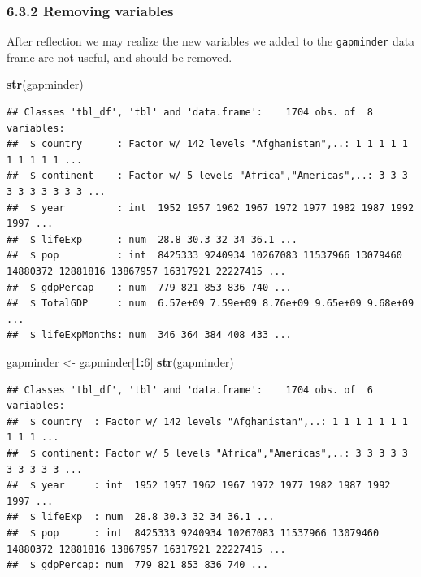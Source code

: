 \documentclass[]{article}
\newenvironment{Shaded}{\begin{snugshade}}{\end{snugshade}}
\newcommand{\KeywordTok}[1]{\textcolor[rgb]{0.13,0.29,0.53}{\textbf{#1}}}
\newcommand{\DecValTok}[1]{\textcolor[rgb]{0.00,0.00,0.81}{#1}}
\newcommand{\StringTok}[1]{\textcolor[rgb]{0.31,0.60,0.02}{#1}}
\newcommand{\OperatorTok}[1]{\textcolor[rgb]{0.81,0.36,0.00}{\textbf{#1}}}
\newcommand{\NormalTok}[1]{#1}
\begin{document}
\subsubsection{6.3.2 Removing variables}\label{removing-variables}

After reflection we may realize the new variables we added to the
\texttt{gapminder} data frame are not useful, and should be removed.

\begin{Shaded}
\begin{Highlighting}[]
\KeywordTok{str}\NormalTok{(gapminder)}
\end{Highlighting}
\end{Shaded}

\begin{verbatim}
## Classes 'tbl_df', 'tbl' and 'data.frame':    1704 obs. of  8 variables:
##  $ country      : Factor w/ 142 levels "Afghanistan",..: 1 1 1 1 1 1 1 1 1 1 ...
##  $ continent    : Factor w/ 5 levels "Africa","Americas",..: 3 3 3 3 3 3 3 3 3 3 ...
##  $ year         : int  1952 1957 1962 1967 1972 1977 1982 1987 1992 1997 ...
##  $ lifeExp      : num  28.8 30.3 32 34 36.1 ...
##  $ pop          : int  8425333 9240934 10267083 11537966 13079460 14880372 12881816 13867957 16317921 22227415 ...
##  $ gdpPercap    : num  779 821 853 836 740 ...
##  $ TotalGDP     : num  6.57e+09 7.59e+09 8.76e+09 9.65e+09 9.68e+09 ...
##  $ lifeExpMonths: num  346 364 384 408 433 ...
\end{verbatim}

\begin{Shaded}
\begin{Highlighting}[]
\NormalTok{gapminder <-}\StringTok{ }\NormalTok{gapminder[}\DecValTok{1}\OperatorTok{:}\DecValTok{6}\NormalTok{]}
\KeywordTok{str}\NormalTok{(gapminder)}
\end{Highlighting}
\end{Shaded}

\begin{verbatim}
## Classes 'tbl_df', 'tbl' and 'data.frame':    1704 obs. of  6 variables:
##  $ country  : Factor w/ 142 levels "Afghanistan",..: 1 1 1 1 1 1 1 1 1 1 ...
##  $ continent: Factor w/ 5 levels "Africa","Americas",..: 3 3 3 3 3 3 3 3 3 3 ...
##  $ year     : int  1952 1957 1962 1967 1972 1977 1982 1987 1992 1997 ...
##  $ lifeExp  : num  28.8 30.3 32 34 36.1 ...
##  $ pop      : int  8425333 9240934 10267083 11537966 13079460 14880372 12881816 13867957 16317921 22227415 ...
##  $ gdpPercap: num  779 821 853 836 740 ...
\end{verbatim}
\end{document}
